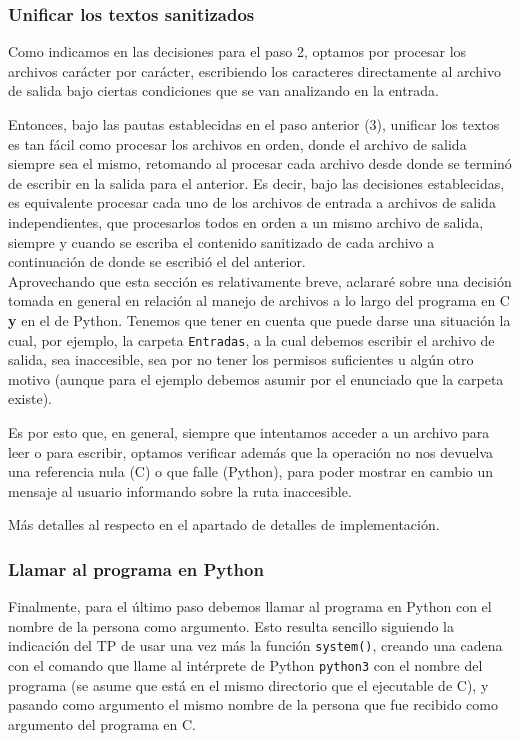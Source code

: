 \documentclass[a4paper]{article}
\begin{document}
\subsubsection{Unificar los textos sanitizados}

Como indicamos en las decisiones para el paso 2, optamos por procesar los archivos carácter por carácter, escribiendo los caracteres directamente al archivo de salida bajo ciertas condiciones que se van analizando en la entrada.

Entonces, bajo las pautas establecidas en el paso anterior (3), unificar los textos es tan fácil como procesar los archivos en orden, donde el archivo de salida siempre sea el mismo, retomando al procesar cada archivo desde donde se terminó de escribir en la salida para el anterior. Es decir, bajo las decisiones establecidas, es equivalente procesar cada uno de los archivos de entrada a archivos de salida independientes, que procesarlos todos en orden a un mismo archivo de salida, siempre y cuando se escriba el contenido sanitizado de cada archivo a continuación de donde se escribió el del anterior.\\

Aprovechando que esta sección es relativamente breve, aclararé sobre una decisión tomada en general en relación al manejo de archivos a lo largo del programa en C \textbf{y} en el de Python. Tenemos que tener en cuenta que puede darse una situación la cual, por ejemplo, la carpeta \texttt{Entradas}, a la cual debemos escribir el archivo de salida, sea inaccesible, sea por no tener los permisos suficientes u algún otro motivo (aunque para el ejemplo debemos asumir por el enunciado que la carpeta existe).

Es por esto que, en general, siempre que intentamos acceder a un archivo para leer o para escribir, optamos verificar además que la operación no nos devuelva una referencia nula (C) o que falle (Python), para poder mostrar en cambio un mensaje al usuario informando sobre la ruta inaccesible.

Más detalles al respecto en el apartado de detalles de implementación.

\subsubsection{Llamar al programa en Python}

Finalmente, para el último paso debemos llamar al programa en Python con el nombre de la persona como argumento. Esto resulta sencillo siguiendo la indicación del TP de usar una vez más la función \texttt{system()}, creando una cadena con el comando que llame al intérprete de Python \texttt{python3} con el nombre del programa (se asume que está en el mismo directorio que el ejecutable de C), y pasando como argumento el mismo nombre de la persona que fue recibido como argumento del programa en C.
\end{document}
